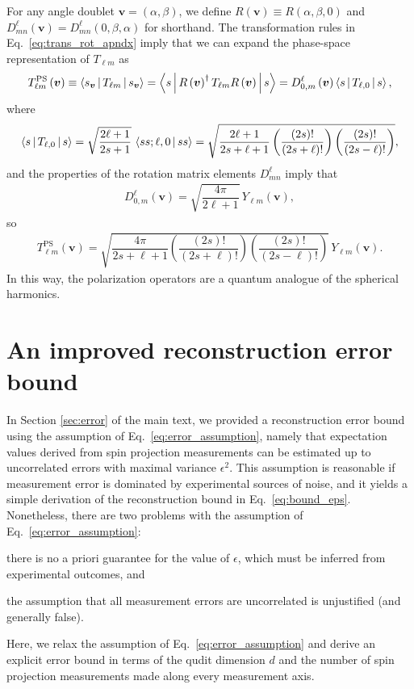 \documentclass[a4paper,twocolumn,unpublished]{quantumarticle}
\renewcommand{\t}{\text} %
\newcommand{\f}[2]{\dfrac{#1}{#2}} %
\newcommand{\p}[1]{\left(#1\right)} %
\newcommand{\bk}{\Braket} %
\begin{document}
For any angle doublet $\bm v=\p{\alpha,\beta}$, we define $R\p{\bm v}\equiv R\p{\alpha,\beta,0}$ and $D^\ell_{mn}\p{\bm v}=D^\ell_{mn}\p{0,\beta,\alpha}$ for shorthand.
The transformation rules in Eq.~\eqref{eq:trans_rot_apndx} imply that we can expand the phase-space representation of $T_{\ell m}$ as
\begin{align}
  T_{\ell m}^{\t{PS}}\p{\bm v}
  \equiv \bk{s_{\bm v} | T_{\ell m} | s_{\bm v}}
  = \bk{s | R\p{\bm v}^\dag T_{\ell m} R\p{\bm v} | s}
  = D^\ell_{0,m}\p{\bm v} \bk{s | T_{\ell,0} | s},
\end{align}
where
\begin{align}
  \bk{s | T_{\ell,0} | s}
  = \sqrt{\f{2\ell+1}{2s+1}} \, \bk{ss;\ell,0|ss}
  = \sqrt{\f{2\ell+1}{2s+\ell+1}
    \p{\f{\p{2s}!}{\p{2s+\ell}!}}
    \p{\f{\p{2s}!}{\p{2s-\ell}!}}},
\end{align}
and the properties of the rotation matrix elements $D^\ell_{mn}$ imply that
\begin{align}
  D^\ell_{0,m}\p{\bm v} = \sqrt{\f{4\pi}{2\ell+1}} \, Y_{\ell m}\p{\bm v},
\end{align}
so
\begin{align}
  T_{\ell m}^{\t{PS}}\p{\bm v}
  = \sqrt{\f{4\pi}{2s+\ell+1}
    \p{\f{\p{2s}!}{\p{2s+\ell}!}} \p{\f{\p{2s}!}{\p{2s-\ell}!}}} \,
  Y_{\ell m}\p{\bm v}.
\end{align}
In this way, the polarization operators are a quantum analogue of the spherical harmonics.

\section{An improved reconstruction error bound}
\label{sec:bound}

In Section \ref{sec:error} of the main text, we provided a reconstruction error bound using the assumption of Eq.~\eqref{eq:error_assumption}, namely that expectation values derived from spin projection measurements can be estimated up to uncorrelated errors with maximal variance $\epsilon^2$.
This assumption is reasonable if measurement error is dominated by experimental sources of noise, and it yields a simple derivation of the reconstruction bound in Eq.~\eqref{eq:bound_eps}.
Nonetheless, there are two problems with the assumption of Eq.~\eqref{eq:error_assumption}:
\begin{enumerate*}
\item there is no a priori guarantee for the value of $\epsilon$, which must be inferred from experimental outcomes, and
\item the assumption that all measurement errors are uncorrelated is unjustified (and generally false).
\end{enumerate*}
Here, we relax the assumption of Eq.~\eqref{eq:error_assumption} and derive an explicit error bound in terms of the qudit dimension $d$ and the number of spin projection measurements made along every measurement axis.
\end{document}
